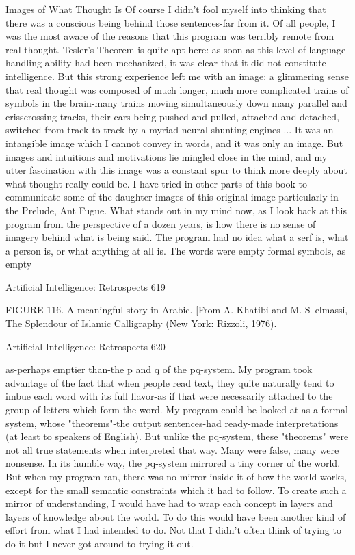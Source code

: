 {                            Images of What Thought Is
Of course I didn't fool myself into thinking that there was a conscious being behind those
sentences-far from it. Of all people, I was the most aware of the reasons that this program
was terribly remote from real thought. Tesler's Theorem is quite apt here: as soon as this
level of language handling ability had been mechanized, it was clear that it did not
constitute intelligence. But this strong experience left me with an image: a glimmering
sense that real thought was composed of much longer, much more complicated trains of
symbols in the brain-many trains moving simultaneously down many parallel and
crisscrossing tracks, their cars being pushed and pulled, attached and detached, switched
from track to track by a myriad neural shunting-engines ...
        It was an intangible image which I cannot convey in words, and it was only an
image. But images and intuitions and motivations lie mingled close in the mind, and my
utter fascination with this image was a constant spur to think more deeply about what
thought really could be. I have tried in other parts of this book to communicate some of
the daughter images of this original image-particularly in the Prelude, Ant Fugue.
        What stands out in my mind now, as I look back at this program from the
perspective of a dozen years, is how there is no sense of imagery behind what is being
said. The program had no idea what a serf is, what a person is, or what anything at all is.
The words were empty formal symbols, as empty




Artificial Intelligence: Retrospects                                                    619

  FIGURE 116. A meaningful story in Arabic. [From A. Khatibi and M. S~elmassi, The
           Splendour of Islamic Calligraphy (New York: Rizzoli, 1976).




Artificial Intelligence: Retrospects                                            620

 as-perhaps emptier than-the p and q of the pq-system. My program took advantage of the
 fact that when people read text, they quite naturally tend to imbue each word with its full
   flavor-as if that were necessarily attached to the group of letters which form the word.
      My program could be looked at as a formal system, whose "theorems"-the output
 sentences-had ready-made interpretations (at least to speakers of English). But unlike the
    pq-system, these "theorems" were not all true statements when interpreted that way.
                            Many were false, many were nonsense.
         In its humble way, the pq-system mirrored a tiny corner of the world. But when
my program ran, there was no mirror inside it of how the world works, except for the
small semantic constraints which it had to follow. To create such a mirror of
understanding, I would have had to wrap each concept in layers and layers of knowledge
about the world. To do this would have been another kind of effort from what I had
intended to do. Not that I didn't often think of trying to do it-but I never got around to
trying it out.

}
